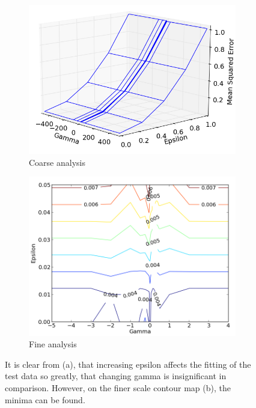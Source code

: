 \documentclass[12pt,notitlepage,twoside]{scrreprt}
\begin{document}
\begin{figure}[h!]
\centering
\begin{subfigure}[b]{.49\textwidth}
  \centering
  \includegraphics[width=\linewidth]{figs/coarse_tune2.png}
  \caption{Coarse analysis\label{coarse}}
\end{subfigure}
\begin{subfigure}[b]{.49\textwidth}
  \centering
  \includegraphics[width=0.9\linewidth]{figs/fine_tune_tr.png}
  \caption{Fine analysis\label{fine}}
\end{subfigure}
\caption{It is clear from (a), that increasing epsilon affects the fitting
	of the test data so greatly, that changing gamma is insignificant in comparison.
	However, on the finer scale contour map (b), the minima can be found.\label{coarse_fine}}
\end{figure}
\end{document}
